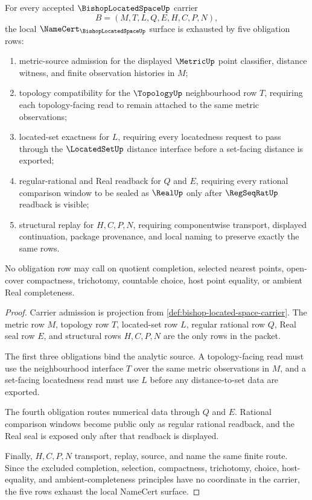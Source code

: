 \begin{theorem}
\label{thm:bishop-located-space-namecert-obligations}
For every accepted $\BishopLocatedSpaceUp$ carrier
$$
B=(M,T,L,Q,E,H,C,P,N),
$$
the local $\NameCert_{\BishopLocatedSpaceUp}$ surface is exhausted by five obligation rows:
\begin{enumerate}
\item metric-source admission for the displayed $\MetricUp$ point classifier, distance witness, and finite observation histories in $M$;
\item topology compatibility for the $\TopologyUp$ neighbourhood row $T$, requiring each topology-facing read to remain attached to the same metric observations;
\item located-set exactness for $L$, requiring every locatedness request to pass through the $\LocatedSetUp$ distance interface before a set-facing distance is exported;
\item regular-rational and Real readback for $Q$ and $E$, requiring every rational comparison window to be sealed as $\RealUp$ only after $\RegSeqRatUp$ readback is visible;
\item structural replay for $H,C,P,N$, requiring componentwise transport, displayed continuation, package provenance, and local naming to preserve exactly the same rows.
\end{enumerate}
No obligation row may call on quotient completion, selected nearest points, open-cover compactness, trichotomy, countable choice, host point equality, or ambient Real completeness.
\end{theorem}
\begin{proof}
Carrier admission is projection from \autoref{def:bishop-located-space-carrier}. The metric row $M$, topology row $T$, located-set row $L$, regular rational row $Q$, Real seal row $E$, and structural rows $H,C,P,N$ are the only rows in the packet.

The first three obligations bind the analytic source. A topology-facing read must use the neighbourhood interface $T$ over the same metric observations in $M$, and a set-facing locatedness read must use $L$ before any distance-to-set data are exported.

The fourth obligation routes numerical data through $Q$ and $E$. Rational comparison windows become public only as regular rational readback, and the Real seal is exposed only after that readback is displayed.

Finally, $H,C,P,N$ transport, replay, source, and name the same finite route. Since the excluded completion, selection, compactness, trichotomy, choice, host-equality, and ambient-completeness principles have no coordinate in the carrier, the five rows exhaust the local NameCert surface.
\end{proof}

